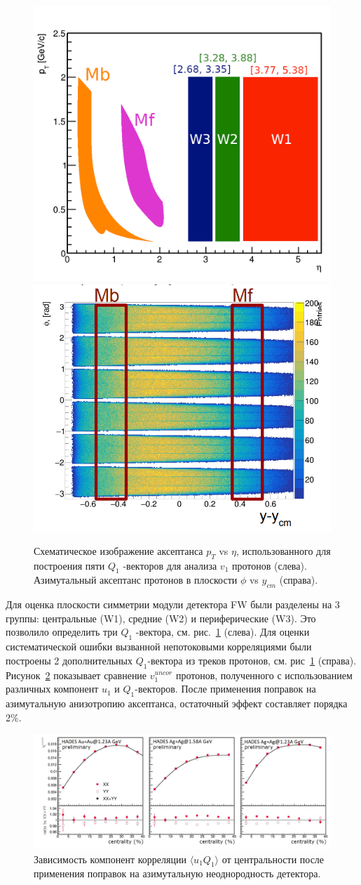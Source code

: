 \begin{figure}[h]
\begin{center}
  \includegraphics[width=0.37\linewidth]{images/eta_pt_qvectors.png}
   \includegraphics[width=0.39\linewidth]{images/hades_phi_rapidity.png}
   \caption{ Схематическое изображение аксептанса $p_T$ vs $\eta$, использованного для построения пяти  $Q_1$ -векторов для анализа $v_1$ протонов (слева).
   Азимутальный аксептанс  протонов в плоскости $\phi$  vs $y_{cm}$ (справа). }
\label{fig:hades_qvectors}
\end{center}
\end{figure}
%
Для оценка плоскости симметрии модули детектора FW были разделены на 3 группы: центральные (W1), средние (W2) и периферические (W3). Это позволило определить три $Q_1$ -вектора, см. рис.~\ref{fig:hades_qvectors} (слева). 
Для оценки систематической ошибки вызванной непотоковыми корреляциями были построены 2 дополнительных $Q_1$-вектора из треков протонов, см. рис~\ref{fig:hades_qvectors} (справа).
Рисунок~\ref{fig:hades_uq_corr} показывает сравнение $v_1^{uncor}$ протонов, полученного с использованием различных компонент $u_1$ и $Q_1$-векторов. 
После применения поправок на азимутальную анизотропию аксептанса, остаточный эффект составляет порядка 2\%.\\
%
\begin{figure}[h]
\begin{center}
\includegraphics[width=0.75\linewidth]{images/hades_u1W1_centrality.png}
\caption{Зависимость компонент корреляции $\langle u_1 Q_1 \rangle$ от центральности после применения поправок на азимутальную неоднородность детектора.}
\label{fig:hades_uq_corr}
\end{center}
\end{figure}


